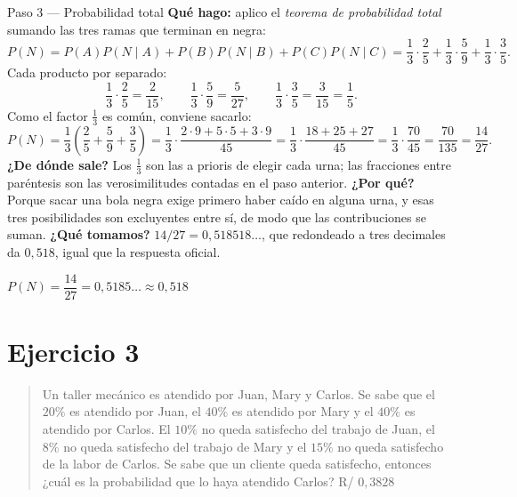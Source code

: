 \documentclass[11pt]{article}
\begin{document}
\begin{sol}
\begin{paso}{Paso 3 --- Probabilidad total}
\textbf{Qué hago:} aplico el \emph{teorema de probabilidad total} sumando las tres ramas que terminan en negra:
\[
P(N)=P(A)P(N\mid A)+P(B)P(N\mid B)+P(C)P(N\mid C)
=\frac{1}{3}\cdot\frac{2}{5}+\frac{1}{3}\cdot\frac{5}{9}+\frac{1}{3}\cdot\frac{3}{5}.
\]
Cada producto por separado:
\[
\frac13\cdot\frac25=\frac{2}{15},\qquad \frac13\cdot\frac59=\frac{5}{27},\qquad \frac13\cdot\frac35=\frac{3}{15}=\frac15 .
\]
Como el factor $\tfrac13$ es común, conviene sacarlo:
\[
P(N)=\frac13\left(\frac25+\frac59+\frac35\right)=\frac13\cdot\frac{2\cdot 9+5\cdot 5+3\cdot 9}{45}=\frac13\cdot\frac{18+25+27}{45}=\frac13\cdot\frac{70}{45}=\frac{70}{135}=\frac{14}{27}.
\]
\textbf{¿De dónde sale?} Los $\tfrac13$ son las a prioris de elegir cada urna; las fracciones entre paréntesis son las verosimilitudes contadas en el paso anterior.
\textbf{¿Por qué?} Porque sacar una bola negra exige primero haber caído en alguna urna, y esas tres posibilidades son excluyentes entre sí, de modo que las contribuciones se suman.
\textbf{¿Qué tomamos?} $14/27=0,518518\ldots$, que redondeado a tres decimales da $0,518$, igual que la respuesta oficial.
\end{paso}

\begin{resp}
$P(N)=\dfrac{14}{27}=0,5185\ldots\approx 0,518$
\end{resp}

\end{sol}

\newpage
\section*{Ejercicio 3}

\begin{quote}
Un taller mecánico es atendido por Juan, Mary y Carlos. Se sabe que el $20\%$ es atendido por Juan, el $40\%$ es atendido por Mary y el $40\%$ es atendido por Carlos. El $10\%$ no queda satisfecho del trabajo de Juan, el $8\%$ no queda satisfecho del trabajo de Mary y el $15\%$ no queda satisfecho de la labor de Carlos. Se sabe que un cliente queda satisfecho, entonces ¿cuál es la probabilidad que lo haya atendido Carlos? \hfill R/ $0,3828$
\end{quote}
\end{document}
